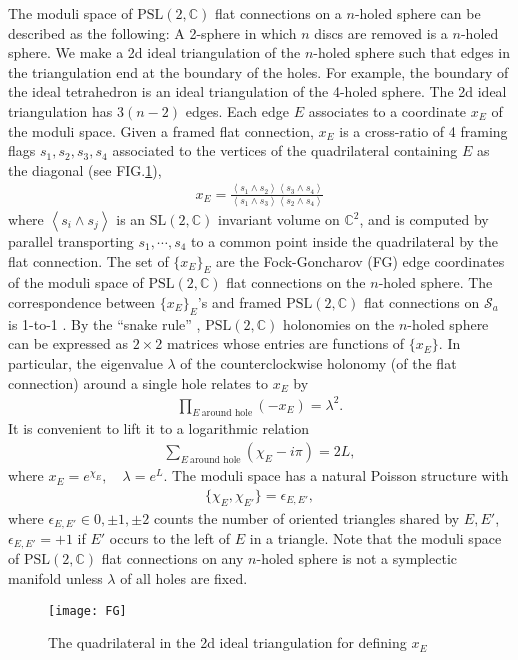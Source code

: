 \documentclass[aps,prd,notitlepage,nofootinbib,superscriptaddress,groupedaddress,twocolumn]{revtex4-1}
\def\C{\mathbb{C}}
\newcommand{\Slc}{\mathrm{SL}(2,\mathbb{C})}
\newcommand{\PSlc}{\mathrm{PSL}(2,\mathbb{C})}
\def\be{\begin{eqnarray}}
\def\ee{\end{eqnarray}}
\newcommand{\cs}{\mathcal S}
\renewcommand{\l}{\lambda}
\newcommand{\lag}{\left\langle}
\newcommand{\rag}{\right\rangle}
\begin{document}
The moduli space of $\PSlc$ flat connections on a $n$-holed sphere can be described as the following: A 2-sphere in which $n$ discs are removed is a $n$-holed sphere. We make a 2d ideal triangulation of the $n$-holed sphere such that edges in the triangulation end at the boundary of the holes. For example, the boundary of the ideal tetrahedron is an ideal triangulation of the 4-holed sphere. The 2d ideal triangulation has $3(n-2)$ edges. Each edge $E$ associates to a coordinate $x_E$ of the moduli space. Given a framed flat connection, $x_E$ is a cross-ratio of 4 framing flags $s_1,s_2,s_3,s_4$ associated to the vertices of the quadrilateral containing $E$ as the diagonal (see FIG.\ref{FG}), 
\be
x_E=\frac{\lag s_1\wedge s_2\rag\lag s_3\wedge s_4\rag}{\lag s_1\wedge s_3\rag\lag s_2\wedge s_4\rag}
\ee
where $\lag s_i\wedge s_j\rag$ is an $\Slc$ invariant volume on $\C^2$, and is computed by parallel transporting $s_1,\cdots,s_4$ to a common point inside the quadrilateral by the flat connection. The set of $\{x_E\}_E$ are the Fock-Goncharov (FG) edge coordinates of the moduli space of $\PSlc$ flat connections on the $n$-holed sphere. The correspondence between $\{x_E\}_E$'s and framed $\PSlc$ flat connections on $\cs_a$ is 1-to-1 \cite{FG03}. By the ``snake rule'' \cite{DGV,GMN09}, $\PSlc$ holonomies on the $n$-holed sphere can be expressed as $2\times 2$ matrices whose entries are functions of $\{x_E\}$. In particular, the eigenvalue $\l$ of the counterclockwise holonomy (of the flat connection) around a single hole relates to $x_E$ by
\be
\prod_{E\ \text{around hole}}(-x_E)=\l^2.
\ee
It is convenient to lift it to a logarithmic relation
\be
\sum_{E\ \text{around hole}}(\chi_E-i\pi)=2L,\label{XEL}
\ee
where $x_E=e^{\chi_E},\quad \l=e^L$. The moduli space has a natural Poisson structure with
\be
\{\chi_E,\chi_{E'}\}=\epsilon_{E,E'},
\ee 
where $\epsilon_{E,E'}\in {0,\pm1,\pm2}$ counts the number of oriented triangles shared by $E,E'$, $\epsilon_{E,E'}=+1$ if $E'$ occurs to the left of $E$ in a triangle. Note that the moduli space of $\PSlc$ flat connections on any $n$-holed sphere is not a symplectic manifold unless $\l$ of all holes are fixed. 


\begin{figure}[h]
	\begin{center}
	\texttt{[image: FG]}
	\caption{The quadrilateral in the 2d ideal triangulation for defining $x_E$}
	\label{FG}
	\end{center}
\end{figure}
\end{document}
